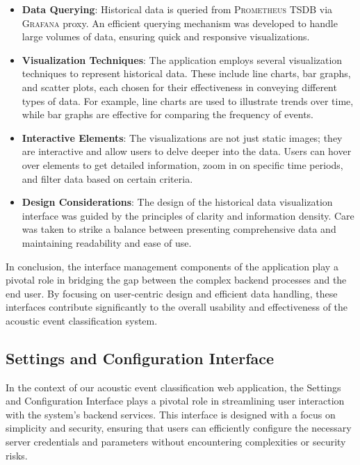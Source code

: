 \begin{itemize}
  \item \textbf{Data Querying}: Historical data is queried from \textsc{Prometheus} TSDB via \textsc{Grafana} proxy. An efficient querying mechanism was developed to handle large volumes of data, ensuring quick and responsive visualizations.
  \item \textbf{Visualization Techniques}: The application employs several visualization techniques to represent historical data. These include line charts, bar graphs, and scatter plots, each chosen for their effectiveness in conveying different types of data. For example, line charts are used to illustrate trends over time, while bar graphs are effective for comparing the frequency of events.
  \item \textbf{Interactive Elements}: The visualizations are not just static images; they are interactive and allow users to delve deeper into the data. Users can hover over elements to get detailed information, zoom in on specific time periods, and filter data based on certain criteria.
  \item \textbf{Design Considerations}: The design of the historical data visualization interface was guided by the principles of clarity and information density. Care was taken to strike a balance between presenting comprehensive data and maintaining readability and ease of use.
\end{itemize}

In conclusion, the interface management components of the application play a pivotal role in bridging the gap between the complex backend processes and the end user. By focusing on user-centric design and efficient data handling, these interfaces contribute significantly to the overall usability and effectiveness of the acoustic event classification system.

\subsection{Settings and Configuration Interface}
In the context of our acoustic event classification web application, the Settings and Configuration Interface plays a pivotal role in streamlining user interaction with the system's backend services. This interface is designed with a focus on simplicity and security, ensuring that users can efficiently configure the necessary server credentials and parameters without encountering complexities or security risks.

